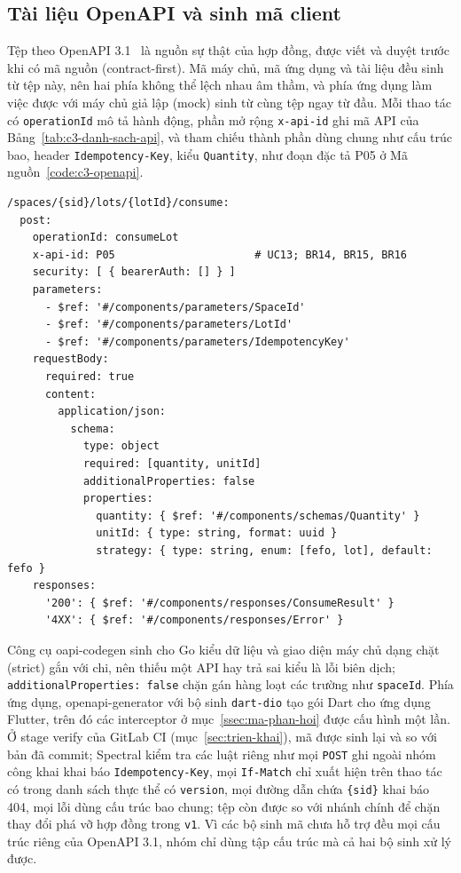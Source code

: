 \subsection{Tài liệu OpenAPI và sinh mã client}\label{ssec:openapi}

Tệp  theo OpenAPI 3.1~\cite{openapi} là nguồn sự thật của hợp đồng, được viết và duyệt trước khi có mã nguồn (contract-first). Mã máy chủ, mã ứng dụng và tài liệu đều sinh từ tệp này, nên hai phía không thể lệch nhau âm thầm, và phía ứng dụng làm việc được với máy chủ giả lập (mock) sinh từ cùng tệp ngay từ đầu. Mỗi thao tác có \texttt{operationId} mô tả hành động, phần mở rộng \texttt{x-api-id} ghi mã API của Bảng~\ref{tab:c3-danh-sach-api}, và tham chiếu thành phần dùng chung như cấu trúc bao, header \texttt{Idempotency-Key}, kiểu \texttt{Quantity}, như đoạn đặc tả P05 ở Mã nguồn~\ref{code:c3-openapi}.

\apiNeed{3.4cm}
\begin{Verbatim}[fontsize=\scriptsize]
/spaces/{sid}/lots/{lotId}/consume:
  post:
    operationId: consumeLot
    x-api-id: P05                      # UC13; BR14, BR15, BR16
    security: [ { bearerAuth: [] } ]
    parameters:
      - $ref: '#/components/parameters/SpaceId'
      - $ref: '#/components/parameters/LotId'
      - $ref: '#/components/parameters/IdempotencyKey'
    requestBody:
      required: true
      content:
        application/json:
          schema:
            type: object
            required: [quantity, unitId]
            additionalProperties: false
            properties:
              quantity: { $ref: '#/components/schemas/Quantity' }
              unitId: { type: string, format: uuid }
              strategy: { type: string, enum: [fefo, lot], default: fefo }
    responses:
      '200': { $ref: '#/components/responses/ConsumeResult' }
      '4XX': { $ref: '#/components/responses/Error' }
\end{Verbatim}

Công cụ oapi-codegen sinh cho Go kiểu dữ liệu và giao diện máy chủ dạng chặt (strict) gắn với chi, nên thiếu một API hay trả sai kiểu là lỗi biên dịch; \texttt{additionalProperties: false} chặn gán hàng loạt các trường như \texttt{spaceId}. Phía ứng dụng, openapi-generator với bộ sinh \texttt{dart-dio} tạo gói Dart cho ứng dụng Flutter, trên đó các interceptor ở mục~\ref{ssec:ma-phan-hoi} được cấu hình một lần. Ở stage verify của GitLab CI (mục~\ref{sec:trien-khai}), mã được sinh lại và so với bản đã commit; Spectral kiểm tra các luật riêng như mọi \texttt{POST} ghi ngoài nhóm công khai khai báo \texttt{Idempotency-Key}, mọi \texttt{If-Match} chỉ xuất hiện trên thao tác có trong danh sách thực thể có \texttt{version}, mọi đường dẫn chứa \texttt{\{sid\}} khai báo 404, mọi lỗi dùng cấu trúc bao chung; tệp còn được so với nhánh chính để chặn thay đổi phá vỡ hợp đồng trong \texttt{v1}. Vì các bộ sinh mã chưa hỗ trợ đều mọi cấu trúc riêng của OpenAPI 3.1, nhóm chỉ dùng tập cấu trúc mà cả hai bộ sinh xử lý được.

